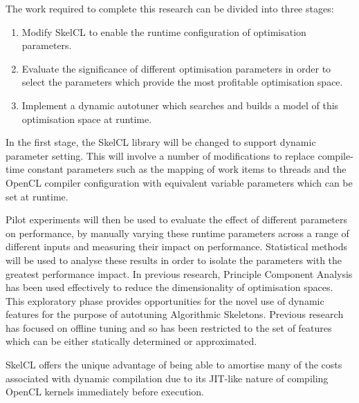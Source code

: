 The work required to complete this research can be divided into three
stages:

\begin{enumerate}
\item Modify SkelCL to enable the runtime configuration of
optimisation parameters.
\item Evaluate the significance of different optimisation parameters
in order to select the parameters which provide the most profitable
optimisation space.
\item Implement a dynamic autotuner which searches and builds a model
of this optimisation space at runtime.
\end{enumerate}

In the first stage, the SkelCL library will be changed to support
dynamic parameter setting. This will involve a number of modifications
to replace compile-time constant parameters such as the mapping of
work items to threads and the OpenCL compiler configuration with
equivalent variable parameters which can be set at runtime.

Pilot experiments will then be used to evaluate the effect of
different parameters on performance, by manually varying these runtime
parameters across a range of different inputs and measuring their
impact on performance. Statistical methods will be used to analyse
these results in order to isolate the parameters with the greatest
performance impact. In previous research, Principle Component Analysis
has been used effectively to reduce the dimensionality of optimisation
spaces. This exploratory phase provides opportunities for the novel
use of dynamic features for the purpose of autotuning Algorithmic
Skeletons. Previous research has focused on offline tuning and so has
been restricted to the set of features which can be either statically
determined or approximated.

SkelCL offers the unique advantage of being able to amortise many of
the costs associated with dynamic compilation due to its JIT-like
nature of compiling OpenCL kernels immediately before execution.




